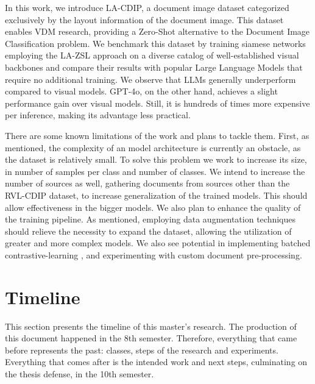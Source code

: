 In this work, we introduce \gls{LA-CDIP}, a document image dataset categorized exclusively by the layout information of the document image. This dataset enables \gls{VDM} research, providing a Zero-Shot alternative to the Document Image Classification problem. We benchmark this dataset by training siamese networks employing the \gls{LA-ZSL} approach on a diverse catalog of well-established visual backbones and compare their results with popular Large Language Models that require no additional training. We observe that \glspl{LLM} generally underperform compared to visual models. GPT-4o, on the other hand, achieves a slight performance gain over visual models. Still, it is hundreds of times more expensive per inference, making its advantage less practical.

There are some known limitations of the work and plans to tackle them. First, as mentioned, the complexity of an model architecture is currently an obstacle, as the dataset is relatively small. To solve this problem we work to increase its size, in number of samples per class and number of classes. We intend to increase the number of sources as well, gathering documents from sources other than the RVL-CDIP dataset, to increase generalization of  the trained models. This should allow effectiveness in the bigger models. We also plan to enhance the quality of the training pipeline. As mentioned, employing data augmentation techniques should relieve the necessity to expand the dataset, allowing the utilization of greater and more complex models. We also see potential in implementing batched contrastive-learning \cite{yang_batchsampler_2023}, and experimenting with custom document pre-processing.

\section{Timeline}

This section presents the timeline of this master's research. The production of this document happened in the 8th semester. Therefore, everything that came before represents the past: classes, steps of the research and experiments. Everything that comes after is the intended work and next steps, culminating on the thesis defense, in the 10th semester.

